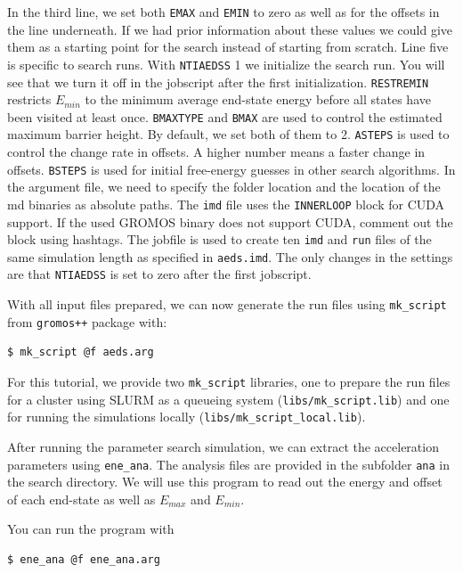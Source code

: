 In the third line, we set both \texttt{EMAX} and \texttt{EMIN} to zero as well as for the offsets in the line underneath. If we had prior information about these values we could give them as a starting point for the search instead of starting from scratch. Line five is specific to search runs. With \texttt{NTIAEDSS} 1 we initialize the search run. You will see that we turn it off in the jobscript after the first initialization. \texttt{RESTREMIN} restricts $E_{min}$ to the minimum average end-state energy before all states have been visited at least once. \texttt{BMAXTYPE} and \texttt{BMAX} are used to control the estimated maximum barrier height. By default, we set both of them to 2. \texttt{ASTEPS} is used to control the change rate in offsets. A higher number means a faster change in offsets. \texttt{BSTEPS} is used for initial free-energy guesses in other search algorithms. In the argument file, we need to specify the folder location and the location of the md binaries as absolute paths. The \texttt{imd} file uses the \texttt{INNERLOOP} block for CUDA support. If the used GROMOS binary does not support CUDA, comment out the block using hashtags. The jobfile is used to create ten \texttt{imd} and \texttt{run} files of the same simulation length as specified in \texttt{aeds.imd}. The only changes in the settings are that 
\texttt{NTIAEDSS} is set to zero after the first jobscript.

With all input files prepared, we can now generate the run files using \texttt{mk\_script} from \texttt{gromos++} package with:
\begin{lstlisting}
$ mk_script @f aeds.arg
\end{lstlisting}

For this tutorial, we provide two \texttt{mk\_script} libraries, one to prepare the run files for a cluster using SLURM as a queueing system (\texttt{libs/mk\_script.lib}) and one for running the simulations locally (\texttt{libs/mk\_script\_local.lib}).

After running the parameter search simulation, we can extract the acceleration parameters using \texttt{ene\_ana}. The analysis files are provided in the subfolder \texttt{ana} in the search directory. 
We will use this program to read out the energy and offset of each end-state as well as $E_{max}$ and $E_{min}$. 

You can run the program with 
\begin{lstlisting}
$ ene_ana @f ene_ana.arg
\end{lstlisting}

